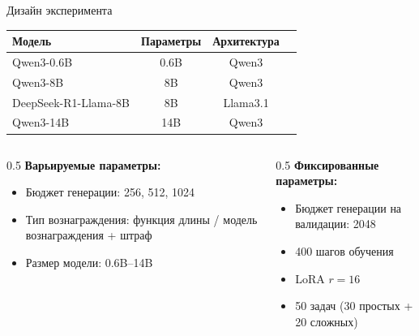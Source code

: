 \begin{frame}{Дизайн эксперимента}
    \begin{table}[h]
    \centering
    \footnotesize
    \begin{tabular}{lccc}
        \hline
        \textbf{Модель} & \textbf{Параметры} & \textbf{Архитектура} \\
        \hline
        Qwen3-0.6B & 0.6B & Qwen3 \\
        Qwen3-8B & 8B & Qwen3 \\
        DeepSeek-R1-Llama-8B & 8B & Llama3.1 \\
        Qwen3-14B & 14B & Qwen3 \\
        \hline
    \end{tabular}
    \end{table}
    
    \vspace{0.2cm}
    \begin{columns}
        \begin{column}{0.5\textwidth}
            \textbf{Варьируемые параметры:}
            \begin{itemize}
                \item Бюджет генерации: 256, 512, 1024
                \item Тип вознаграждения: функция длины / модель вознаграждения + штраф
                \item Размер модели: 0.6B--14B
            \end{itemize}
        \end{column}
        \begin{column}{0.5\textwidth}
            \textbf{Фиксированные параметры:}
            \begin{itemize}
                \item Бюджет генерации на валидации: 2048 
                \item 400 шагов обучения
                \item LoRA $r{=}16$
                \item 50 задач (30 простых + 20 сложных)
            \end{itemize}
        \end{column}
    \end{columns}
\end{frame}


